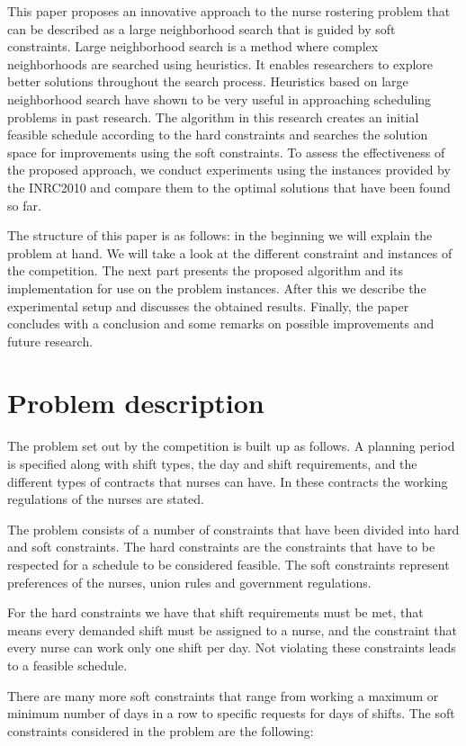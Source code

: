 \documentclass{article}
\begin{document}
This paper proposes an innovative approach to the nurse rostering problem that can be described as a large neighborhood search that is guided by soft constraints.
Large neighborhood search is a method where complex neighborhoods are searched using heuristics. It enables researchers to explore better solutions throughout the search process.
Heuristics based on large neighborhood search have shown to be very useful in approaching scheduling problems in past research\cite{Pisinger}. 
The algorithm in this research creates an initial feasible schedule according to the hard constraints and searches the solution space for improvements using the soft constraints.
To assess the effectiveness of the proposed approach, we conduct experiments using the instances provided by the INRC2010 and compare them to the optimal solutions that have been found so far. 

The structure of this paper is as follows: in the beginning we will explain the problem at hand.
We will take a look at the different constraint and instances of the competition.
The next part presents the proposed algorithm and its implementation for use on the problem instances.
After this we describe the experimental setup and discusses the obtained results.
Finally, the paper concludes with a conclusion and some remarks on possible improvements and future research.

\section{Problem description}
The problem set out by the competition is built up as follows.
A planning period is specified along with shift types, the day and shift requirements, and the different types of contracts that nurses can have.
In these contracts the working regulations of the nurses are stated.

The problem consists of a number of constraints that have been divided into hard and soft constraints.
The hard constraints are the constraints that have to be respected for a schedule to be considered feasible.
The soft constraints represent preferences of the nurses, union rules and government regulations.

For the hard constraints we have that shift requirements must be met, that means every demanded shift must be assigned to a nurse, and the constraint that every nurse can work only one shift per day.
Not violating these constraints leads to a feasible schedule.

There are many more soft constraints that range from working a maximum or minimum number of days in a row to specific requests for days of shifts.
The soft constraints considered in the problem are the following:
\end{document}
